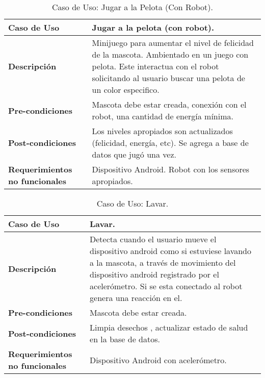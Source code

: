 \begin{table}[htbp!]
  \centering
  \begin{tabular}{|p{4cm}|p{6cm}|}\hline
    \bf{Caso de Uso}                   & Jugar a la pelota (con robot). \\ \hline
    \bf{Descripci\'on}                 & Minijuego para aumentar el nivel de felicidad de la mascota. Ambientado en un juego con pelota. Este interactua con el robot solicitando al usuario buscar una pelota de un color especifico. \\ \hline
    \bf{Pre-condiciones}               & Mascota debe estar creada, conexi\'on con el robot, una cantidad de energ\'ia m\'inima. \\ \hline
    \bf{Post-condiciones}              & Los niveles apropiados son actualizados (felicidad, energ\'ia, etc). Se agrega a base de datos que jug\'o una vez.  \\ \hline
    \bf{Requerimientos no funcionales} & Dispositivo Android. Robot con los sensores apropiados. \\ \hline
  \end{tabular}
  \caption[~~Caso de Uso: Jugar a la Pelota (Con Robot)]{Caso de Uso: Jugar a la Pelota (Con Robot).}
  \label{table:JugarPelota-CR}
\end{table}

\begin{table}[htbp!]
  \centering
  \begin{tabular}{|p{4cm}|p{6cm}|}\hline
    \bf{Caso de Uso}                   & Lavar.\\ \hline
    \bf{Descripci\'on}                 & Detecta cuando el usuario mueve el dispositivo android como si estuviese lavando a la mascota, a trav\'es de movimiento del dispositivo android registrado por el aceler\'ometro. Si se esta conectado al robot genera una reacci\'on en el. \\ \hline
    \bf{Pre-condiciones}               & Mascota debe estar creada. \\ \hline
    \bf{Post-condiciones}              & Limpia desechos , actualizar estado de salud en la base de datos.  \\ \hline
    \bf{Requerimientos no funcionales} & Dispositivo Android con aceler\'ometro. \\ \hline
  \end{tabular}
  \caption[~~Caso de Uso: Lavar]{Caso de Uso: Lavar.}
  \label{table:Lavar}
\end{table}

